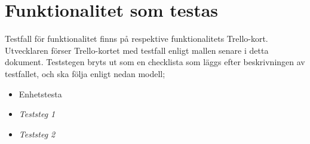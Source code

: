 \section{Funktionalitet som testas}
Testfall för funktionalitet finns på respektive funktionalitets Trello-kort. Utvecklaren förser Trello-kortet med testfall enligt mallen senare i detta dokument. Teststegen bryts ut som en checklista som läggs efter beskrivningen av testfallet, och ska följa enligt nedan modell; 

\begin{itemize}
\item Enhetstesta
\item \textit{Teststeg 1}
\item \textit{Teststeg 2}
\end{itemize}